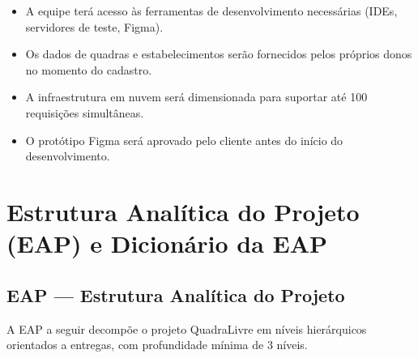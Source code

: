\documentclass[12pt,a4paper,oneside]{report}
\begin{document}
\begin{itemize}
    \item A equipe terá acesso às ferramentas de desenvolvimento necessárias (IDEs, servidores de teste, Figma).
    \item Os dados de quadras e estabelecimentos serão fornecidos pelos próprios donos no momento do cadastro.
    \item A infraestrutura em nuvem será dimensionada para suportar até 100 requisições simultâneas.
    \item O protótipo Figma será aprovado pelo cliente antes do início do desenvolvimento.
\end{itemize}

\chapter{Estrutura Analítica do Projeto (EAP) e Dicionário da EAP}

\section{EAP --- Estrutura Analítica do Projeto}

A EAP a seguir decompõe o projeto QuadraLivre em níveis hierárquicos orientados a entregas, com profundidade mínima de 3 níveis.
\end{document}
